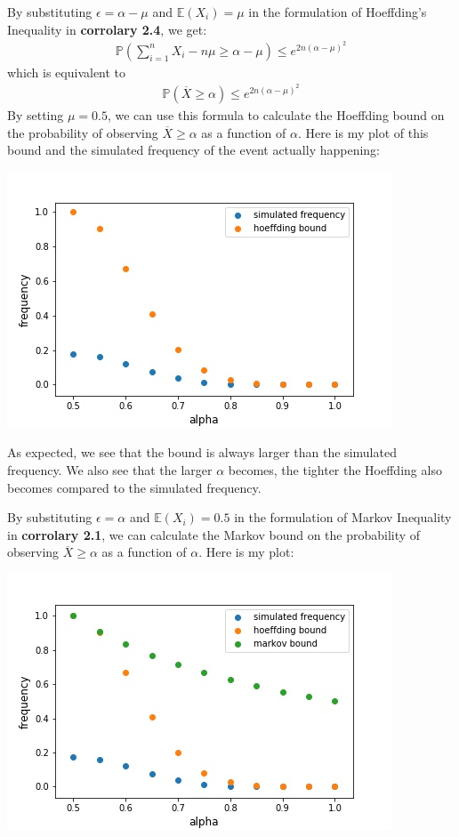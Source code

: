 By substituting $\epsilon = \alpha - \mu$ and $\mathbb{E}(X_i) = \mu$ in the formulation of Hoeffding's Inequality in \textbf{corrolary 2.4}, we get:
\begin{align}
\mathbb{P}\left( \sum_{i=1}^n X_i - n\mu \geq \alpha - \mu \right  ) \leq e^{2n(\alpha - \mu)^2}
\end{align}
which is equivalent to
\begin{align}
\mathbb{P}\left( \overline{X} \geq \alpha \right  ) \leq e^{2n(\alpha - \mu)^2}
\end{align}
By setting $\mu = 0.5$, we can use this formula to calculate the Hoeffding bound on the probability of observing $\overline{X} \geq \alpha$ as a function of $\alpha$. Here is my plot of this bound and the simulated frequency of the event actually happening:
\begin{center}
\includegraphics[scale = 0.7]{illustration_of_hoeffding/fig2.jpg}
\end{center}
As expected, we see that the bound is always larger than the simulated frequency. We also see that the larger $\alpha$ becomes, the tighter the Hoeffding also becomes compared to the simulated frequency.

By substituting $\epsilon = \alpha$ and $\mathbb{E}(X_i) = 0.5$ in the formulation of Markov Inequality in \textbf{corrolary 2.1}, we can calculate the Markov bound on the probability of observing $\overline{X} \geq \alpha$ as a function of $\alpha$. Here is my plot:

\begin{center}
\includegraphics[scale = 0.7]{illustration_of_hoeffding/fig3.jpg}
\end{center}

